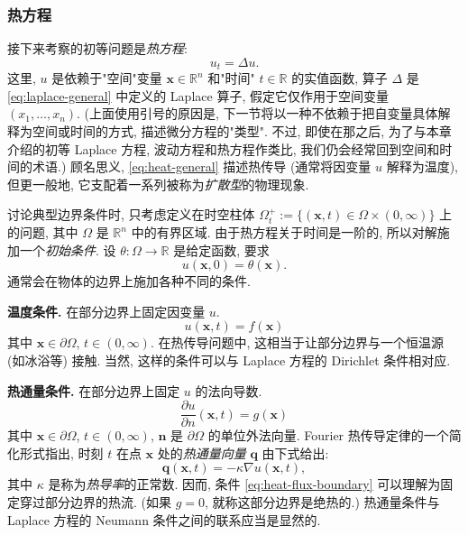 \subsubsection{热方程}\label{subsec:heat-equation}

接下来考察的初等问题是\emph{热方程}:
\begin{equation}\label{eq:heat-general}
u_t=\Delta u.
\end{equation}
这里, $u$ 是依赖于"空间"变量 $\bm{x}\in\mathbb{R}^n$ 和"时间" $t\in\mathbb{R}$ 的实值函数, 算子 $\Delta$ 是 \eqref{eq:laplace-general} 中定义的 Laplace 算子, 假定它仅作用于空间变量 $(x_1,\ldots,x_n)$. (上面使用引号的原因是, 下一节将以一种不依赖于把自变量具体解释为空间或时间的方式, 描述微分方程的"类型". 不过, 即使在那之后, 为了与本章介绍的初等 Laplace 方程, 波动方程和热方程作类比, 我们仍会经常回到空间和时间的术语.) 顾名思义, \eqref{eq:heat-general} 描述热传导 (通常将因变量 $u$ 解释为温度), 但更一般地, 它支配着一系列被称为\emph{扩散型}的物理现象.

讨论典型边界条件时, 只考虑定义在时空柱体 $\Omega_t^+:=\{(\bm{x},t)\in\Omega\times(0,\infty)\}$ 上的问题, 其中 $\Omega$ 是 $\mathbb{R}^n$ 中的有界区域. 由于热方程关于时间是一阶的, 所以对解施加一个\emph{初始条件}. 设 $\theta:\Omega\to\mathbb{R}$ 是给定函数, 要求
\begin{equation}\label{eq:heat-general-initial}
u(\bm{x},0)=\theta(\bm{x}).
\end{equation}
通常会在物体的边界上施加各种不同的条件.

\textbf{温度条件.} 在部分边界上固定因变量 $u$.
\begin{equation}\label{eq:heat-temperature-boundary}
u(\bm{x},t)=f(\bm{x})
\end{equation}
其中 $\bm{x}\in\partial\Omega$, $t\in(0,\infty)$. 在热传导问题中, 这相当于让部分边界与一个恒温源 (如冰浴等) 接触. 当然, 这样的条件可以与 Laplace 方程的 Dirichlet 条件相对应.

\textbf{热通量条件.} 在部分边界上固定 $u$ 的法向导数.
\begin{equation}\label{eq:heat-flux-boundary}
\dfrac{\partial u}{\partial n}(\bm{x},t)=g(\bm{x})
\end{equation}
其中 $\bm{x}\in\partial\Omega$, $t\in(0,\infty)$, $\bm{n}$ 是 $\partial\Omega$ 的单位外法向量. Fourier 热传导定律的一个简化形式指出, 时刻 $t$ 在点 $\bm{x}$ 处的\emph{热通量向量} $\bm{q}$ 由下式给出:
\begin{equation}\label{eq:fourier-heat-flux-law}
\bm{q}(\bm{x},t)=-\kappa\nabla u(\bm{x},t),
\end{equation}
其中 $\kappa$ 是称为\emph{热导率}的正常数. 因而, 条件 \eqref{eq:heat-flux-boundary} 可以理解为固定穿过部分边界的热流. (如果 $g=0$, 就称这部分边界是绝热的.) 热通量条件与 Laplace 方程的 Neumann 条件之间的联系应当是显然的.

